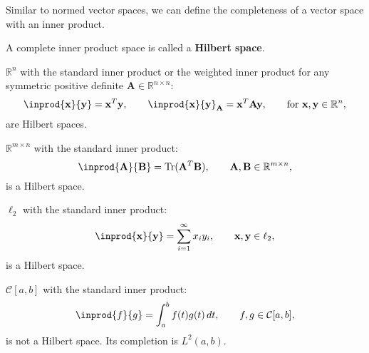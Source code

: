 \documentclass{huhtakm-template-book-v2}
\DeclareMathOperator{\Tr}{Tr}
\begin{document}
    Similar to normed vector spaces, we can define the completeness of a vector space with an inner product.
    \begin{defn}
        A complete inner product space is called a \textbf{Hilbert space}.
    \end{defn}
    \begin{eg}
        $\mathbb{R}^{n}$ with the standard inner product or the weighted inner product for any symmetric positive definite $\mathbf{A} \in \mathbb{R}^{n \times n}$:
        \begin{equation*}
            \inprod{\mathbf{x}}{\mathbf{y}} = \mathbf{x}^{T}\mathbf{y}, \qquad \inprod{\mathbf{x}}{\mathbf{y}}_{\mathbf{A}} = \mathbf{x}^{T}\mathbf{A}\mathbf{y}, \qquad \text{for } \mathbf{x}, \mathbf{y} \in \mathbb{R}^{n},
        \end{equation*}
        are Hilbert spaces.
    \end{eg}
    \begin{eg}
        $\mathbb{R}^{m \times n}$ with the standard inner product:
        \begin{equation*}
            \inprod{\mathbf{A}}{\mathbf{B}} = \Tr(\mathbf{A}^{T}\mathbf{B}), \qquad \mathbf{A}, \mathbf{B} \in \mathbb{R}^{m \times n},
        \end{equation*}
        is a Hilbert space.
    \end{eg}
    \begin{eg}
        $\ell_{2}$ with the standard inner product:
        \begin{equation*}
            \inprod{\mathbf{x}}{\mathbf{y}} = \sum_{i=1}^{\infty}x_{i}y_{i}, \qquad \mathbf{x}, \mathbf{y} \in \ell_{2},
        \end{equation*}
        is a Hilbert space.
    \end{eg}
    \begin{eg}
        $\mathcal{C}[a, b]$ with the standard inner product:
        \begin{equation*}
            \inprod{f}{g} = \int_{a}^{b}f(t)g(t)\,dt, \qquad f, g \in \mathcal{C}[a, b],
        \end{equation*}
        is not a Hilbert space. Its completion is $L^{2}(a, b)$.
    \end{eg}
    \newpage
    
\end{document}
